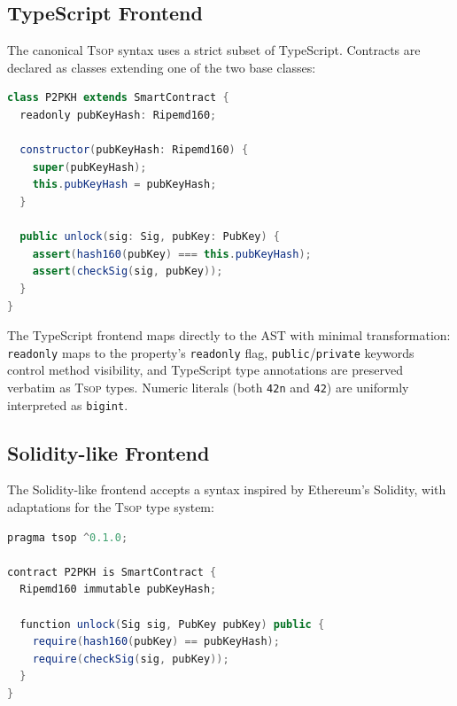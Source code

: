 \documentclass[11pt,a4paper]{article}
\newcommand{\tsop}{\textsc{Tsop}}
\newcommand{\bigintty}{\texttt{bigint}}
\begin{document}
\subsection{TypeScript Frontend}
\label{sec:frontend-ts}

The canonical \tsop{} syntax uses a strict subset of TypeScript. Contracts
are declared as classes extending one of the two base classes:

\begin{lstlisting}[style=tsop,language=Java,
  morekeywords={class,extends,constructor,super,readonly,public,private,const,let,if,else,for,return,assert,bigint,boolean}]
class P2PKH extends SmartContract {
  readonly pubKeyHash: Ripemd160;

  constructor(pubKeyHash: Ripemd160) {
    super(pubKeyHash);
    this.pubKeyHash = pubKeyHash;
  }

  public unlock(sig: Sig, pubKey: PubKey) {
    assert(hash160(pubKey) === this.pubKeyHash);
    assert(checkSig(sig, pubKey));
  }
}
\end{lstlisting}

The TypeScript frontend maps directly to the AST with minimal transformation:
\texttt{readonly} maps to the property's \texttt{readonly} flag,
\texttt{public}/\texttt{private} keywords control method visibility, and
TypeScript type annotations are preserved verbatim as \tsop{} types.
Numeric literals (both \texttt{42n} and \texttt{42}) are uniformly
interpreted as \bigintty{}.

\subsection{Solidity-like Frontend}
\label{sec:frontend-sol}

The Solidity-like frontend accepts a syntax inspired by Ethereum's Solidity,
with adaptations for the \tsop{} type system:

\begin{lstlisting}[style=tsop,language=Java,
  morekeywords={pragma,contract,is,immutable,function,public,private,returns,require,int,bool,bytes}]
pragma tsop ^0.1.0;

contract P2PKH is SmartContract {
  Ripemd160 immutable pubKeyHash;

  function unlock(Sig sig, PubKey pubKey) public {
    require(hash160(pubKey) == pubKeyHash);
    require(checkSig(sig, pubKey));
  }
}
\end{lstlisting}
\end{document}
